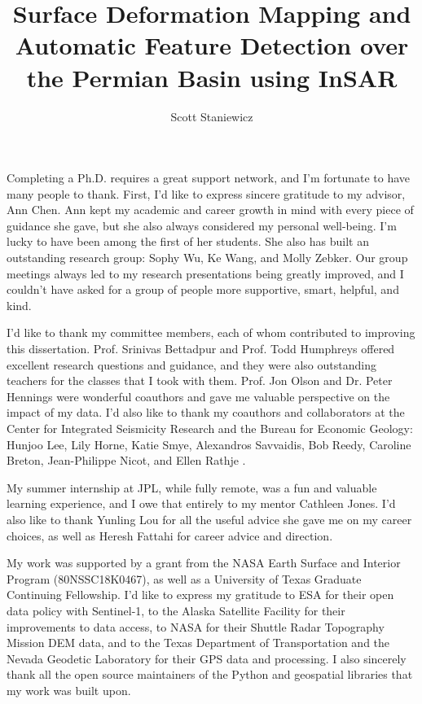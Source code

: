 \documentclass{utexasthesis}
\title{Surface Deformation Mapping and Automatic Feature Detection over the Permian Basin using InSAR}
\author{Scott Staniewicz}
\begin{document}
\maketitle

%


\begin{acknowledgments}

Completing a Ph.D. requires a great support network, and I'm fortunate to have many people to thank.
First, I'd like to express sincere gratitude to my advisor, Ann Chen. 
Ann kept my academic and career growth in mind with every piece of guidance she gave, but she also always considered my personal well-being. I'm lucky to have been among the first of her students. She also has  built an outstanding research group: Sophy Wu, Ke Wang, and Molly Zebker. Our group meetings always led to my research presentations being greatly improved, and I couldn't have asked for a group of people more supportive, smart, helpful, and kind.

I'd like to thank my committee members, each of whom contributed to improving this dissertation. Prof. Srinivas Bettadpur and  Prof. Todd Humphreys offered excellent research questions and guidance, and they were also outstanding teachers for the classes that I took with them. Prof. Jon Olson and Dr. Peter Hennings were wonderful coauthors and gave me valuable perspective on the impact of my data.  I'd also like to thank my coauthors and collaborators at the Center for Integrated Seismicity Research and the Bureau for Economic Geology: Hunjoo Lee, Lily Horne, Katie Smye, Alexandros Savvaidis, Bob Reedy, Caroline Breton, Jean-Philippe Nicot, and Ellen Rathje .

My summer internship at JPL, while fully remote, was a fun and valuable learning experience, and I owe that entirely to my mentor Cathleen Jones. I'd also like to thank Yunling Lou for all the useful advice she gave me on my career choices, as well as Heresh Fattahi for career advice and direction.

My work was supported by a grant from the NASA Earth Surface and Interior Program (80NSSC18K0467), as well as a University of Texas Graduate Continuing Fellowship. I'd like to express my gratitude to ESA for their open data policy with Sentinel-1, to the Alaska Satellite Facility for their improvements to data access, to NASA for their Shuttle Radar Topography Mission DEM data, and to the Texas Department of Transportation and the Nevada Geodetic Laboratory for their GPS data and processing. I also sincerely thank all the open source maintainers of the Python and geospatial libraries that my work was built upon.



\end{acknowledgments}
\end{document}
